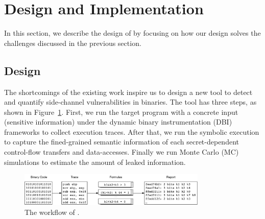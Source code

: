 \section{Design and Implementation}
In this section, we describe the design of \tool{} by focusing on how our design
solves the challenges discussed in the previous section.

\subsection{Design}
The shortcomings of the existing work inspire us to design a new tool to detect
and quantify side-channel vulnerabilities in binaries. The tool has three steps,
as shown in Figure~\ref{fig:workflow}. First, we run the target program with a
concrete input (sensitive information) under the dynamic binary instrumentation
(DBI) frameworks to collect execution traces. After that, we run the symbolic
execution to capture the fined-grained semantic information of each
secret-dependent control-flow transfers and data-accesses. Finally we run Monte
Carlo (MC) simulations to estimate the amount of leaked information.

\begin{figure}[ht]
    \centering
    \includegraphics[width=0.8\textwidth]{./figures/workflow.pdf}
    \caption{The workflow of \tool{}.}
    \label{fig:workflow}
\end{figure}

